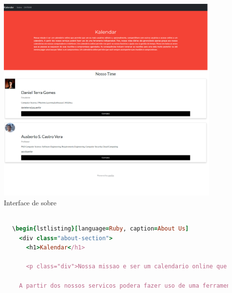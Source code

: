 \begin{itemize}
              \begin{figure}[H]
                \begin{center}
                  \includegraphics[width=12cm]{Pictures/interface/sobre.png}
                  \caption{Interface de sobre} \label{sobre}
                \end{center}
              \end{figure}
              \begin{lstlisting}[language=Ruby, caption=Tela inicial do sistema (home)]

        \begin{lstlisting}[language=Ruby, caption=About Us]
          <div class="about-section">
            <h1>Kalendar</h1>

            <p class="div">Nossa missao e ser um calendario online que permite que um ou mais usuarios editem e, opcionalmente, compartilhem com outros usuarios o acesso online a um calendario.

          A partir dos nossos servicos podera fazer uso de uma ferramenta indispensavel. Pois, nossas vidas diarias sao gerenciaveis apenas gracas aos nossos calendarios em nossos computadores e telefones. Um calendario online permite-nos gerir os nossos horarios e ajuda-nos na gestao do tempo. Pense em todas as vezes que as pessoas se esquecem de suas reunioes e compromissos agendados. As consequencias incluem remarcar as reunioes para uma data muito posterior ou ate mesmo pagar uma taxa por faltar a um compromisso. Um calendario online permite que voce sempre acompanhe suas reunioes e compromissos.</p>


\end{lstlisting}
\end{itemize}
